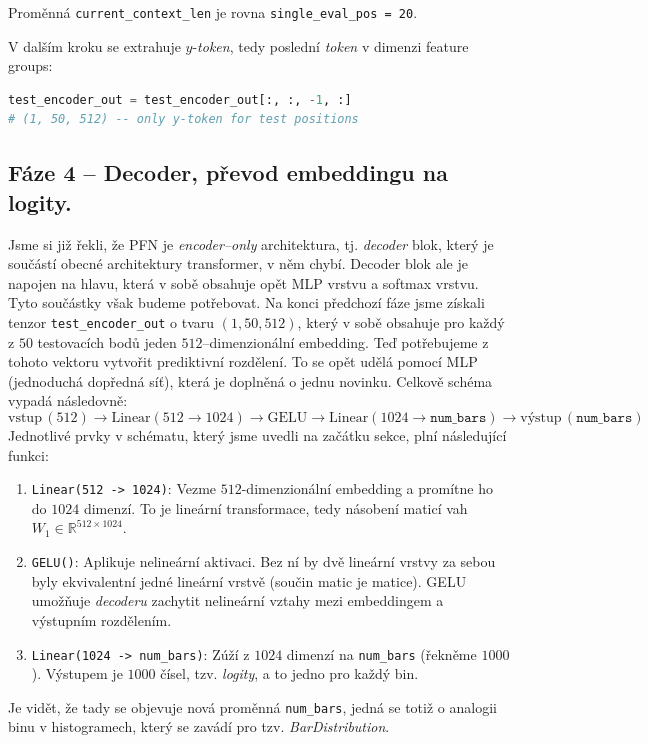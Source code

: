 Proměnná \lstinline|current_context_len| je rovna \lstinline|single_eval_pos = 20|.

V dalším kroku se extrahuje $y$-\emph{token}, tedy poslední \emph{token} v dimenzi feature groups:
\begin{lstlisting}[language=Python]
test_encoder_out = test_encoder_out[:, :, -1, :]
# (1, 50, 512) -- only y-token for test positions
\end{lstlisting}

\subsection{Fáze 4 – Decoder, převod embeddingu na logity.}
\label{subsec:faze4-dekoder}
Jsme si již řekli, že PFN je \emph{encoder–only} architektura, tj. \emph{decoder} blok, který je součástí obecné architektury transformer, v něm chybí.
Decoder blok ale je napojen na hlavu, která v sobě obsahuje opět MLP vrstvu a softmax vrstvu.
Tyto součástky však budeme potřebovat.
Na konci předchozí fáze jsme získali tenzor \texttt{test\_encoder\_out} o tvaru $(1, 50, 512)$, který v sobě obsahuje pro každý z $50$ testovacích bodů jeden $512$–dimenzionální embedding.
Teď potřebujeme z tohoto vektoru vytvořit prediktivní rozdělení.
To se opět udělá pomocí MLP (jednoduchá dopředná síť), která je doplněná o jednu novinku.
Celkově schéma vypadá následovně:
$$\text{vstup}\,(512) \to \text{Linear}(512 \to 1024) \to \text{GELU} \to \text{Linear}(1024 \to \texttt{num\_bars}) \to \text{výstup}\,(\texttt{num\_bars})$$
Jednotlivé prvky v schématu, který jsme uvedli na začátku sekce, plní následující funkci:
\begin{enumerate}
    \item \lstinline|Linear(512 -> 1024)|: Vezme $512$-dimenzionální embedding a promítne ho do $1024$ dimenzí. To je lineární transformace, tedy násobení maticí vah $W_1 \in \mathbb{R}^{512 \times 1024}$.
    \item \lstinline|GELU()|: Aplikuje nelineární aktivaci. Bez ní by dvě lineární vrstvy za sebou byly ekvivalentní jedné lineární vrstvě (součin matic je matice). GELU umožňuje \emph{decoderu} zachytit nelineární vztahy mezi embeddingem a výstupním rozdělením.
    \item \lstinline|Linear(1024 -> num_bars)|: Zúží z $1024$ dimenzí na \lstinline|num_bars| (řekněme $1000$). Výstupem je $1000$ čísel, tzv. \textit{logity}, a to jedno pro každý bin.
\end{enumerate}
Je vidět, že tady se objevuje nová proměnná \texttt{num\_bars}, jedná se totiž o analogii binu v histogramech, který se zavádí pro tzv. \textit{BarDistribution}.

